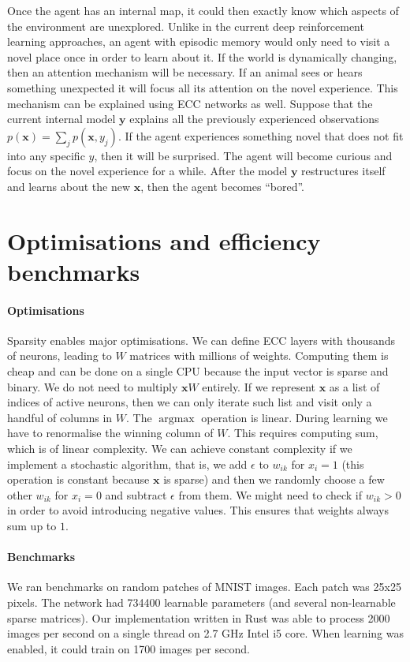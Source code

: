 \documentclass[12pt]{article}
\DeclareMathOperator*{\argmax}{argmax}
\begin{document}
Once the agent has an internal map, it could then exactly know which aspects of the environment are unexplored. Unlike in the current deep reinforcement learning approaches, an agent with episodic memory would only need to visit a novel place once in order to learn about it. If the world is dynamically changing, then an attention mechanism will be necessary. If an animal sees or hears something unexpected it will focus all its attention on the novel experience. This mechanism can be explained using ECC networks as well. Suppose that the current internal model $\boldsymbol{y}$ explains all the previously experienced observations $p(\boldsymbol{x})=\sum_j p(\boldsymbol{x},y_j)$. If the agent experiences something novel that does not fit into any specific $y$, then it will be surprised. The agent will become curious and focus on the novel experience for a while. After the model  $\boldsymbol{y}$ restructures itself and learns about the new $\boldsymbol{x}$, then the agent becomes ``bored''. 

\section{Optimisations and efficiency benchmarks}

\paragraph{Optimisations}
Sparsity enables major optimisations. We can define ECC layers with thousands of neurons, leading to $W$ matrices with millions of weights. Computing them is cheap and can be done on a single CPU because the input vector is sparse and binary. We do not need to multiply $\boldsymbol{x}W$ entirely. If we represent $\boldsymbol{x}$ as a list of indices of active neurons, then we can only iterate such list and visit only a handful of columns in $W$. The $\argmax$ operation is linear. During learning we have to renormalise the winning column of $W$. This requires computing sum, which is of linear complexity. We can achieve constant complexity if we implement a stochastic algorithm, that is, we add $\epsilon$ to $w_{ik}$ for $x_i=1$ (this operation is constant because $\boldsymbol{x}$ is sparse) and then we randomly choose a few other $w_{ik}$ for $x_i=0$ and subtract $\epsilon$ from them. We might need to check if $w_{ik}>0$ in order to avoid introducing negative values. This ensures that weights always sum up to $1$.

\paragraph{Benchmarks}
We ran benchmarks on random patches of MNIST images. Each patch was 25x25 pixels. The network had 734400 learnable parameters (and several non-learnable sparse matrices). Our implementation written in Rust was able to process 2000 images per second on a single thread on 2.7 GHz Intel i5 core. When learning was enabled, it could train on 1700 images per second.
\end{document}
